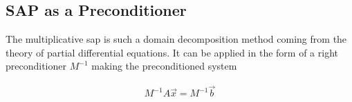 \documentclass{article}
\theoremstyle{plain} %
\theoremstyle{convention} %
\theoremstyle{remark} %
\numberwithin{equation}{section}
\begin{document}
\subsection{SAP as a Preconditioner}

The multiplicative \acrlong{sap} is such a domain decomposition method coming from the theory of partial differential equations. It can be applied in the form of a right preconditioner $M^{-1}$ making the preconditioned system

\begin{align}
    M^{-1} A \vec{x} = M^{-1} \vec{b} \label{eq:sap:preconditioned}
\end{align}
\end{document}

